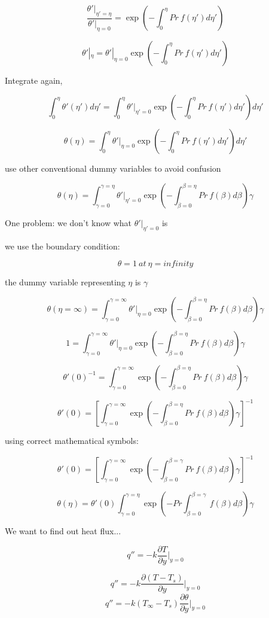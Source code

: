 \documentclass[11pt]{article}
\begin{document}
$$ \frac{\theta'|_{\eta'=\eta}}{\theta'|_{\eta=0}} = \exp ( -  \int_0^\eta  Pr \ f (\eta') d\eta') $$

$$ \theta'|_{\eta} =  \theta'|_{\eta=0}\exp ( -  \int_0^\eta  Pr \ f (\eta') d\eta') $$

Integrate again,

$$ \int_0^\eta \theta' (\eta') d\eta' = \int_0^\eta  \theta'|_{\eta'=0}\exp ( -  \int_0^\eta  Pr \ f (\eta') d\eta') d\eta' $$

$$ \theta (\eta) = \int_0^\eta  \theta'|_{\eta=0}\exp ( -  \int_0^\eta  Pr \ f (\eta') d\eta') d\eta' $$

use other conventional dummy variables to avoid confusion

$$ \theta (\eta) = \int_{\gamma=0}^{\gamma=\eta}  \theta'|_{\eta'=0}\exp ( -  \int_{\beta=0}^{\beta=\eta}  Pr \ f (\beta) d\beta) \gamma $$

One problem: we don't know what $\theta'|_{\eta'=0}$ is

we use the boundary condition:

$$\theta=1 \ at \ \eta = infinity$$

the dummy variable representing $\eta$ is $\gamma$


$$ \theta (\eta=\infty) = \int_{\gamma=0}^{\gamma=\infty}  \theta'|_{\eta=0}\exp ( -  \int_{\beta=0}^{\beta=\eta}  Pr \ f (\beta) d\beta) \gamma $$


$$ 1 = \int_{\gamma=0}^{\gamma=\infty}  \theta'|_{\eta=0}\exp ( -  \int_{\beta=0}^{\beta=\eta}  Pr \ f (\beta) d\beta) \gamma $$

$$ \theta'(0)^{-1} = \int_{\gamma=0}^{\gamma=\infty}  \exp ( -  \int_{\beta=0}^{\beta=\eta}  Pr \ f (\beta) d\beta) \gamma $$

$$ \theta'(0) = \left[ \int_{\gamma=0}^{\gamma=\infty}  \exp ( -  \int_{\beta=0}^{\beta=\eta}  Pr \ f (\beta) d\beta) \gamma \right] ^{-1}$$

using correct mathematical symbols:

$$ \theta'(0) = \left[ \int_{\gamma=0}^{\gamma=\infty}  \exp ( -  \int_{\beta=0}^{\beta=\gamma}  Pr \ f (\beta) d\beta) \gamma \right] ^{-1}$$

$$ \theta (\eta) = \theta'(0) \int_{\gamma=0}^{\gamma=\eta}    \exp ( -   Pr   \int_{\beta=0}^{\beta=\gamma}\ f (\beta) d\beta) \gamma $$


We want to find out heat flux...

$$q'' = - k \frac{\partial T}{\partial y}|_{y=0}$$

$$q'' = - k \frac{\partial (T-T_s)}{\partial y}|_{y=0}$$
$$q'' = - k (T_\infty-T_s) \frac{\partial \theta}{\partial y}|_{y=0}$$
\end{document}
